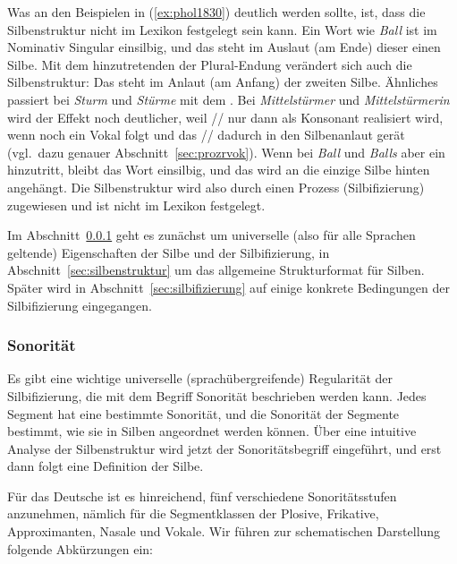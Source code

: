 Was an den Beispielen in (\ref{ex:phol1830}) deutlich werden sollte, ist, dass die Silbenstruktur nicht im Lexikon festgelegt sein kann.
Ein Wort wie \textit{Ball} ist im Nominativ Singular einsilbig, und das \textipa{[l]} steht im Auslaut (am Ende) dieser einen Silbe.
Mit dem hinzutretenden \textipa{[@]} der Plural-Endung verändert sich auch die Silbenstruktur:
Das \textipa{[l]} steht im Anlaut (am Anfang) der zweiten Silbe.
Ähnliches passiert bei \textit{Sturm} und \textit{Stürme} mit dem \textipa{[m]}.
Bei \textit{Mittelstürmer}  und \textit{Mittelstürmerin}  wird der Effekt noch deutlicher, weil // nur dann als Konsonant \textipa{[K]} realisiert wird, wenn noch ein Vokal folgt und das // dadurch in den Silbenanlaut gerät (vgl.\ dazu genauer Abschnitt~\ref{sec:prozrvok}).
Wenn bei \textit{Ball} und \textit{Balls} aber ein \textipa{[s]} hinzutritt, bleibt das Wort einsilbig, und das \textipa{[s]} wird an die einzige Silbe hinten angehängt.
Die Silbenstruktur wird also durch einen Prozess (Silbifizierung) zugewiesen und ist nicht im Lexikon festgelegt.

Im Abschnitt~\ref{sec:sonoritaet} geht es zunächst um universelle (also für alle Sprachen geltende) Eigenschaften der Silbe und der Silbifizierung, in Abschnitt~\ref{sec:silbenstruktur} um das allgemeine Strukturformat für Silben.
Später wird in Abschnitt~\ref{sec:silbifizierung} auf einige konkrete Bedingungen der Silbifizierung eingegangen.

\subsubsection{Sonorität}

\label{sec:sonoritaet}

Es gibt eine wichtige universelle (sprachübergreifende) Regularität der Silbifizierung, die mit dem Begriff Sonorität beschrieben werden kann.
Jedes Segment hat eine bestimmte Sonorität, und die Sonorität der Segmente bestimmt, wie sie in Silben angeordnet werden können.
Über eine intuitive Analyse der Silbenstruktur wird jetzt der Sonoritätsbegriff eingeführt, und erst dann folgt eine Definition der Silbe.

Für das Deutsche ist es hinreichend, fünf verschiedene Sonoritätsstufen anzunehmen, nämlich für die Segmentklassen der Plosive, Frikative, Approximanten, Nasale und Vokale.
Wir führen zur schematischen Darstellung folgende Abkürzungen ein:

